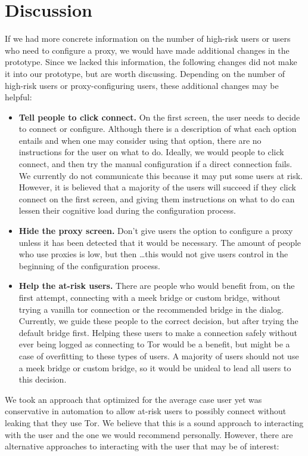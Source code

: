 \documentclass[USenglish,oneside,twocolumn]{article}
\begin{document}
\section{Discussion} 
\label{sec:discussion}
If we had more concrete information on the number of high-risk users or users who need to configure a proxy, we would have made additional changes in the prototype. Since we lacked this information, the following changes did not make it into our prototype, but are worth discussing. Depending on the number of high-risk users or proxy-configuring users, these additional changes may be helpful: \\

\begin{itemize}
\item {\bfseries Tell people to click connect.} On the first screen, the user needs to decide to connect or configure. Although there is a description of what each option entails and when one may consider using that option, there are no instructions for the user on what to do. Ideally, we would people to click connect, and then try the manual configuration if a direct connection fails. We currently do not communicate this because it may put some users at risk. However, it is believed that a majority of the users will succeed if they click connect on the first screen, and giving them instructions on what to do can lessen their cognitive load during the configuration process. 
\item{\bfseries Hide the proxy screen.} Don't give users the option to configure a proxy unless it has been detected that it would be necessary. The amount of people who use proxies is low, but then \ldots this would not give users control in the beginning of the configuration process. 
\item{\bfseries Help the at-risk users.} There are people who would benefit from, on the first attempt, connecting with a meek bridge or custom bridge, without trying a vanilla tor connection or the recommended bridge in the dialog. Currently, we guide these people to the correct decision, but after trying the default bridge first. Helping these users to make a connection safely without ever being logged as connecting to Tor would be a benefit, but might be a case of overfitting to these types of users. A majority of users should not use a meek bridge or custom bridge, so it would be unideal to lead all users to this decision.
\end{itemize} 

We took an approach that optimized for the average case user yet was conservative in automation to allow at-risk users to possibly connect without leaking that they use Tor. We believe that this is a sound approach to interacting with the user and the one we would recommend personally. However, there are alternative approaches to interacting with the user that may be of interest: \\
\end{document}
